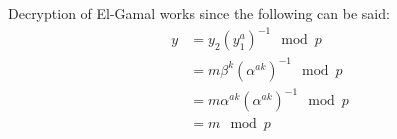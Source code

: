 
Decryption of El-Gamal works since the following can be said:
\begin{align*}
  y &= y_2(y_1^a)^{-1} \mod p \\
  &= m\beta^k(\alpha^{ak})^{-1} \mod p \\
  &= m\alpha^{ak}(\alpha^{ak})^{-1} \mod p \\
  &= m \mod p
\end{align*}
